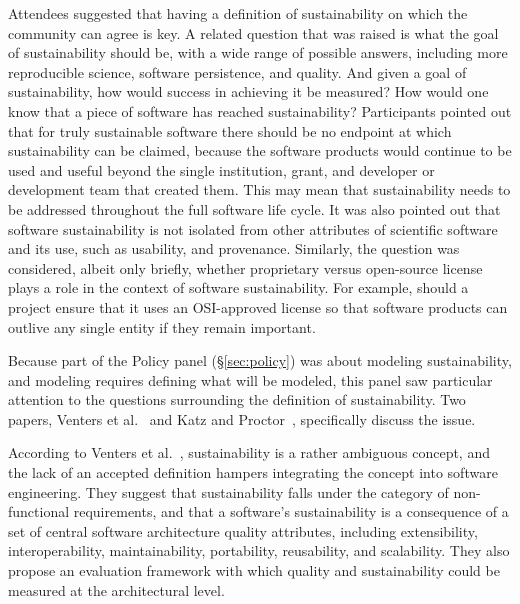 \documentclass[11pt, oneside]{amsart}
\begin{document}
Attendees suggested that having a definition of sustainability on
which the community can agree is key.  A related question that was
raised is what the goal of sustainability should be, with a wide range
of possible answers, including more reproducible science, software
persistence, and quality.  And given a goal of sustainability, how
would success in achieving it be measured?  How would one know that a
piece of software has reached sustainability? Participants pointed out
that for truly sustainable software there should be no endpoint at
which sustainability can be claimed, because the software products
would continue to be used and useful beyond the single institution,
grant, and developer or development team that created them. This may
mean that sustainability needs to be addressed throughout the full
software life cycle.  It was also pointed out that software
sustainability is not isolated from other attributes of scientific
software and its use, such as usability, and provenance. Similarly,
the question was considered, albeit only briefly, whether proprietary
versus open-source license plays a role in the context of software
sustainability. For example, should a project ensure that it uses an
OSI-approved license so that software products can outlive any single
entity if they remain important.

Because part of the Policy panel (\S\ref{sec:policy}) was about
modeling sustainability, and modeling requires defining what will be
modeled, this panel saw particular attention to the questions
surrounding the definition of sustainability. Two papers, Venters et
al.~\cite{Venters_WSSSPE} and Katz and Proctor~\cite{Katz_WSSSPE},
specifically discuss the issue.

According to Venters et al.~\cite{Venters_WSSSPE}, sustainability is a
rather ambiguous concept, and the lack of an accepted definition
hampers integrating the concept into software engineering. They
suggest that sustainability falls under the category of non-functional
requirements, and that a software's sustainability is a consequence of
a set of central software architecture quality attributes, including
extensibility, interoperability, maintainability, portability,
reusability, and scalability. They also propose an evaluation
framework with which quality and sustainability could be measured at
the architectural level.
\end{document}
